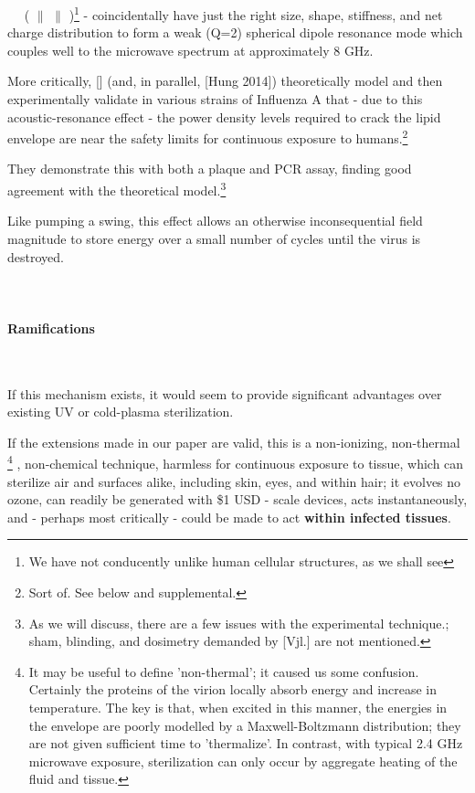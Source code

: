 \documentclass[fleqn,10pt]{article}
\begin{document}
\clearpage
\begin{multicols}{1}




\cite{frohlichLongrangeCoherenceEnergy1968} \textrightarrow \ \cite{frohlichBiologicalEffectsMicrowaves1980} \textrightarrow \ (\cite{hungFocusingReflectarrayIts2014} $\parallel$ \cite{yangEfficientStructureResonance2015} $\parallel$ \cite{sunResonantDipolarCoupling2017})\footnote{We have not conducently unlike human cellular structures, as we shall see} - coincidentally have just the right size, shape, stiffness, and net charge distribution to form a weak (Q=2) spherical dipole resonance mode which couples well to the microwave spectrum at approximately 8 GHz.

More critically, [] (and, in parallel, [Hung 2014]) theoretically model and then experimentally validate in various strains of Influenza A that - due to this acoustic-resonance effect - the power density levels required to crack the lipid envelope are near the safety limits for continuous exposure to humans.\footnote{Sort of. See below and supplemental.}

They demonstrate this with both a plaque and PCR assay, finding good agreement with the theoretical model.\footnote{As we will discuss, there are a few issues with the experimental technique.; sham, blinding, and dosimetry demanded by [Vjl.] are not mentioned.}

Like pumping a swing, this effect allows an otherwise inconsequential field magnitude to store energy over a small number of cycles until the virus is destroyed. \\
\\\\

\paragraph{Ramifications}\

If this mechanism exists, it would seem to provide significant advantages over existing UV or cold-plasma sterilization. 

If the extensions made in our paper are valid, this is a non-ionizing, non-thermal
%
\footnote{It may be useful to define 'non-thermal'; it caused us some confusion. Certainly the proteins of the virion locally absorb energy and increase in temperature. The key is that, when excited in this manner, the energies in the envelope are poorly modelled by a Maxwell-Boltzmann distribution; they are not given sufficient time to 'thermalize'. In contrast, with typical 2.4 GHz microwave exposure, sterilization can only occur by aggregate heating of the fluid and tissue.} 
%
, non-chemical technique, harmless for continuous exposure to tissue, which can sterilize air and surfaces alike, including skin, eyes, and within hair; it evolves no ozone, can readily be generated with \$1 USD - scale devices, acts instantaneously, and - perhaps most critically - could be made to act {\bf within infected tissues}.


\end{multicols}
\end{document}
